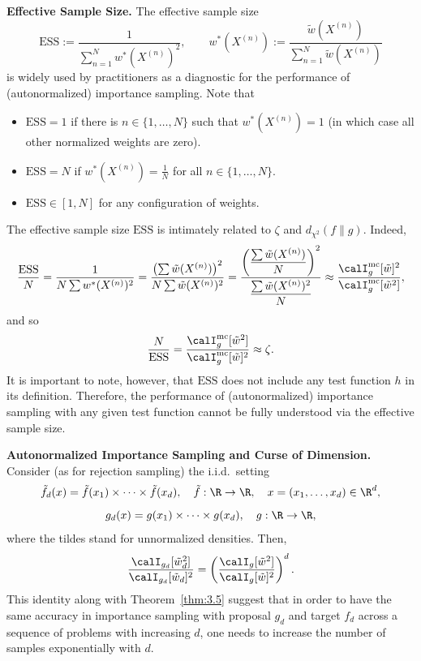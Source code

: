 \medskip
\noindent\textbf{Effective Sample Size.}
The effective sample size
\[
  \mathrm{ESS}
  := \frac{1}{\displaystyle\sum_{n=1}^{N} w^*\!\left(X^{(n)}\right)^2},
  \qquad
  w^*\!\left(X^{(n)}\right)
  := \frac{\tilde{w}\!\left(X^{(n)}\right)}%
          {\displaystyle\sum_{n=1}^{N} \tilde{w}\!\left(X^{(n)}\right)}
\]
is widely used by practitioners as a diagnostic for the performance of
(autonormalized) importance sampling. Note that
\begin{itemize}
  \item $\mathrm{ESS} = 1$ if there is $n \in \{1,\ldots,N\}$ such that
        $w^*(X^{(n)}) = 1$ (in which case all other normalized weights are
        zero).
  \item $\mathrm{ESS} = N$ if $w^*(X^{(n)}) = \tfrac{1}{N}$ for all
        $n \in \{1,\ldots,N\}$.
  \item $\mathrm{ESS} \in [1, N]$ for any configuration of weights.
\end{itemize}
The effective sample size $\mathrm{ESS}$ is intimately related to $\zeta$ and
$d_{\chi^2}(f\|g)$. Indeed,
\[
  \frac{\mathrm{ESS}}{N}
  = \frac{1}{N\sum w^*(X^{(n)})^2}
  = \frac{\bigl(\sum \tilde{w}(X^{(n)})\bigr)^2}{N\sum \tilde{w}(X^{(n)})^2}
  = \frac{\left(\dfrac{\sum \tilde{w}(X^{(n)})}{N}\right)^2}%
         {\dfrac{\sum \tilde{w}(X^{(n)})^2}{N}}
  \approx
  \frac{\calI_g^{\mathrm{mc}}[\tilde{w}]^2}{\calI_g^{\mathrm{mc}}[\tilde{w}^2]},
\]
and so
\[
  \frac{N}{\mathrm{ESS}}
  = \frac{\calI_g^{\mathrm{mc}}[\tilde{w}^2]}{\calI_g^{\mathrm{mc}}[\tilde{w}]^2}
  \approx \zeta.
\]
It is important to note, however, that $\mathrm{ESS}$ does not include any test
function $h$ in its definition. Therefore, the performance of (autonormalized)
importance sampling with any given test function cannot be fully understood via
the effective sample size.

\medskip
\noindent\textbf{Autonormalized Importance Sampling and Curse of Dimension.}
Consider (as for rejection sampling) the i.i.d.\ setting
\[
  \tilde{f}_d(x)
  = \tilde{f}(x_1) \times \cdots \times \tilde{f}(x_d),
  \quad \tilde{f}: \R \to \R,
  \quad x = (x_1,\ldots,x_d) \in \R^d,
\]
\[
  g_d(x) = g(x_1) \times \cdots \times g(x_d),
  \quad g: \R \to \R,
\]
where the tildes stand for unnormalized densities. Then,
\[
  \frac{\calI_{g_d}[\tilde{w}_d^2]}{\calI_{g_d}[\tilde{w}_d]^2}
  = \left(\frac{\calI_g[\tilde{w}^2]}{\calI_g[\tilde{w}]^2}\right)^d.
\]
This identity along with Theorem~\ref{thm:3.5} suggest that in order to have the
same accuracy in importance sampling with proposal $g_d$ and target $f_d$ across
a sequence of problems with increasing $d$, one needs to increase the number of
samples exponentially with $d$.

